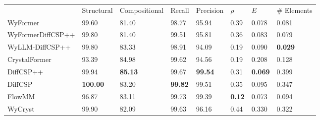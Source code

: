 \begin{tabular}{llllllll}
{} & {Structural} & {Compositional} & {Recall} & {Precision} & {$\rho$} & {$E$} & {# Elements} \\
WyFormer & 99.60 & 81.40 & 98.77 & 95.94 & 0.39 & 0.078 & 0.081 \\
WyFormerDiffCSP++ & 99.80 & 81.40 & 99.51 & 95.81 & 0.36 & 0.083 & 0.079 \\
WyLLM-DiffCSP++ & 99.80 & 83.33 & 98.91 & 94.09 & 0.19 & 0.090 & \bfseries 0.029 \\
CrystalFormer & 93.39 & 84.98 & 99.62 & 94.56 & 0.19 & 0.208 & 0.128 \\
DiffCSP++ & 99.94 & \bfseries 85.13 & 99.67 & \bfseries 99.54 & 0.31 & \bfseries 0.069 & 0.399 \\
DiffCSP & \bfseries 100.00 & 83.20 & \bfseries 99.82 & 99.51 & 0.35 & 0.095 & 0.347 \\
FlowMM & 96.87 & 83.11 & 99.73 & 99.39 & \bfseries 0.12 & 0.073 & 0.094 \\
WyCryst & 99.90 & 82.09 & 99.63 & 96.16 & 0.44 & 0.330 & 0.322 \\
\end{tabular}
